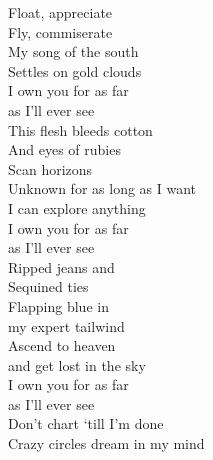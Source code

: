 Float, appreciate\\
Fly, commiserate\\
My song of the south\\
Settles on gold clouds\\

I own you for as far\\
as I'll ever see\\

This flesh bleeds cotton\\
And eyes of rubies\\
Scan horizons\\
Unknown for as long as I want\\
I can explore anything\\

I own you for as far\\
as I'll ever see\\

Ripped jeans and\\
Sequined ties\\
Flapping blue in\\
my expert tailwind\\
Ascend to heaven\\
and get lost in the sky\\

I own you for as far\\
as I'll ever see\\

Don't chart `till I'm done\\
Crazy circles dream in my mind\\

